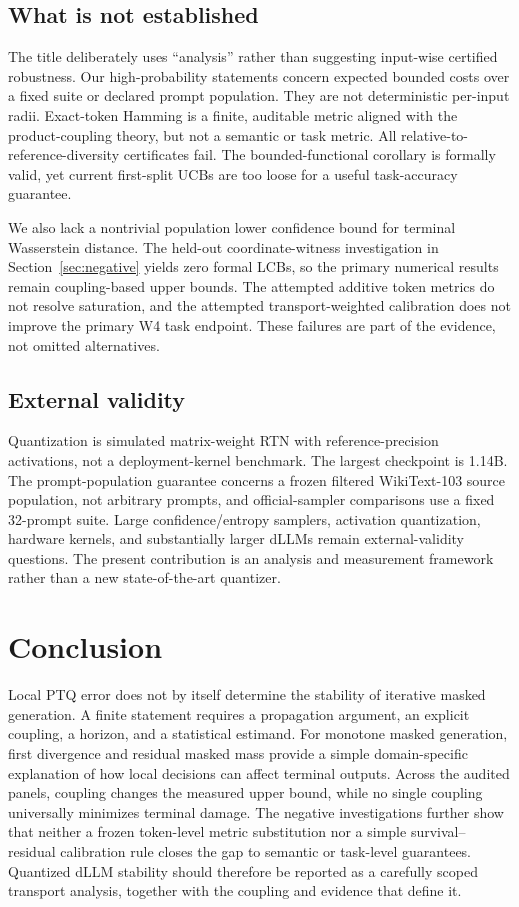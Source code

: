 \subsection{What is not established}
The title deliberately uses ``analysis'' rather than suggesting input-wise certified robustness. Our high-probability statements concern expected bounded costs over a fixed suite or declared prompt population. They are not deterministic per-input radii. Exact-token Hamming is a finite, auditable metric aligned with the product-coupling theory, but not a semantic or task metric. All relative-to-reference-diversity certificates fail. The bounded-functional corollary is formally valid, yet current first-split UCBs are too loose for a useful task-accuracy guarantee.

We also lack a nontrivial population lower confidence bound for terminal Wasserstein distance. The held-out coordinate-witness investigation in Section~\ref{sec:negative} yields zero formal LCBs, so the primary numerical results remain coupling-based upper bounds. The attempted additive token metrics do not resolve saturation, and the attempted transport-weighted calibration does not improve the primary W4 task endpoint. These failures are part of the evidence, not omitted alternatives.

\subsection{External validity}
Quantization is simulated matrix-weight RTN with reference-precision activations, not a deployment-kernel benchmark. The largest checkpoint is 1.14B. The prompt-population guarantee concerns a frozen filtered WikiText-103 source population, not arbitrary prompts, and official-sampler comparisons use a fixed 32-prompt suite. Large confidence/entropy samplers, activation quantization, hardware kernels, and substantially larger dLLMs remain external-validity questions. The present contribution is an analysis and measurement framework rather than a new state-of-the-art quantizer.

\section{Conclusion}
Local PTQ error does not by itself determine the stability of iterative masked generation. A finite statement requires a propagation argument, an explicit coupling, a horizon, and a statistical estimand. For monotone masked generation, first divergence and residual masked mass provide a simple domain-specific explanation of how local decisions can affect terminal outputs. Across the audited panels, coupling changes the measured upper bound, while no single coupling universally minimizes terminal damage. The negative investigations further show that neither a frozen token-level metric substitution nor a simple survival--residual calibration rule closes the gap to semantic or task-level guarantees. Quantized dLLM stability should therefore be reported as a carefully scoped transport analysis, together with the coupling and evidence that define it.
